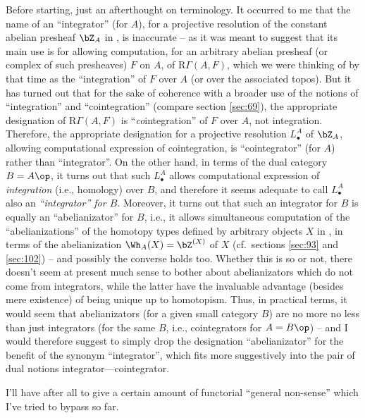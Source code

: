 Before starting, just an afterthought on terminology. It occurred to
me that the name of an ``integrator'' (for $A$), for a projective
resolution of the constant abelian presheaf $\bZ_A$ in \Ahatab, is
inaccurate -- as it was meant to suggest that its main use is for
allowing computation, for an arbitrary abelian presheaf (or complex of
such presheaves) $F$ on $A$, of $\mathrm R\Gamma(A,F)$, which we were
thinking of by that time as the ``integration'' of $F$ over $A$ (or
over the associated topos). But it has turned out that for the sake of
coherence with a broader use of the notions of ``integration'' and
``cointegration'' (compare section \ref{sec:69}), the appropriate
designation of $\mathrm R\Gamma(A,F)$ is ``\emph{co}integration'' of
$F$ over $A$, not integration. Therefore, the appropriate designation
for a projective resolution $L_\bullet^A$ of $\bZ_A$, allowing
computational expression of cointegration, is ``cointegrator'' (for
$A$) rather than ``integrator''. On the other hand, in terms of the
dual category $B=A\op$, it turns out that such $L_\bullet^A$ allows
computational expression of \emph{integration} (i.e., homology) over
$B$, and therefore it seems adequate to call $L_\bullet^A$ also an
\emph{``integrator'' for $B$}. Moreover, it turns out that such an
integrator for $B$ is equally an ``abelianizator'' for $B$, i.e., it
allows simultaneous computation of the ``abelianizations'' of the
homotopy types defined by arbitrary objects $X$ in \Ahat, in terms of
the abelianization $\Wh_A(X)=\bZ^{(X)}$ of $X$ (cf.\ sections
\ref{sec:93} and \ref{sec:102}) -- and possibly the converse holds
too. Whether this is so or not, there doesn't seem at present much
sense to bother about abelianizators which do not come from
integrators, while the latter have the invaluable advantage (besides
mere existence) of being unique up to homotopism. Thus, in practical
terms, it would seem that abelianizators (for a given small category
$B$) are no more no less than just integrators (for the same $B$,
i.e., cointegrators for $A=B\op$) -- and I would therefore suggest to
simply drop the designation ``abelianizator'' for the benefit of the
synonym ``integrator'', which fits more suggestively into the pair of
dual notions integrator---cointegrator.

\label{sec:104}%
I'll have after all to give a certain amount of functorial ``general
non-sense'' which I've tried to bypass so far.

